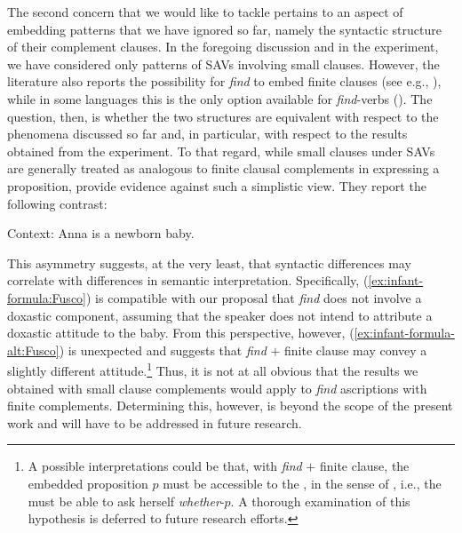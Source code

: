 \documentclass[output=paper,colorlinks,citecolor=brown]{langscibook}
\begin{document}
The second concern that we would like to tackle pertains to an aspect of  embedding patterns that we have ignored so far, namely the syntactic structure of their complement clauses. In the foregoing discussion and in the experiment, we have considered only patterns of SAVs involving small clauses. However, the literature also reports the possibility for \textit{find} to embed finite clauses (see e.g., \cite{bouchard_thesis_2012,kennedy_willer_2022}), while in some languages this is the only option available for \textit{find}-verbs (\cite{saebo_2009,korotkova_anand_find_2021}). The question, then, is whether the two structures are equivalent with respect to the phenomena discussed so far and, in particular, with respect to the results obtained from the experiment. To that regard, while small clauses under SAVs are generally treated as analogous to finite clausal complements in expressing a proposition, \citet{crespo2019tasting} provide evidence against such a simplistic view. They report the following contrast:

\ea Context: Anna is a newborn baby.
\z
\z

This asymmetry suggests, at the very least, that syntactic differences may correlate with differences in semantic interpretation. Specifically, (\ref{ex:infant-formula:Fusco}) is compatible with our proposal that \textit{find} does not involve a doxastic component, assuming that the speaker does not intend to attribute a doxastic attitude to the baby. From this perspective, however, (\ref{ex:infant-formula-alt:Fusco}) is unexpected and suggests that \textit{find} $+$ finite clause may convey a slightly different attitude.\footnote{A possible interpretations could be that, with \textit{find} $+$ finite clause, the embedded proposition $p$ must be accessible to the , in the sense of \citet{yalcin2018}, i.e., the  must be able to ask herself \textit{whether}-$p$. A thorough examination of this hypothesis is deferred to future research efforts.}
Thus, it is not at all obvious that the results we obtained with small clause complements would apply to \textit{find}  ascriptions with finite complements. Determining this, however, is beyond the scope of the present work and will have to be addressed in future research.
\end{document}
